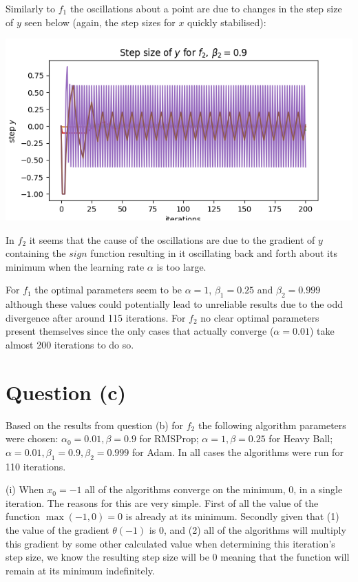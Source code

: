 \documentclass[12pt]{article}
\begin{document}
Similarly to $f_1$ the oscillations about a point are due to changes in the step size of $y$ seen below (again, the step sizes for $x$ quickly stabilised):

\begin{center}
    \includegraphics[scale=0.6]{figs/b/b_iii_stepy_f2.png}
\end{center}

In $f_2$ it seems that the cause of the oscillations are due to the gradient of $y$ containing the $sign$ function resulting in it oscillating back and forth about its minimum when the learning rate $\alpha$ is too large.

For $f_1$ the optimal parameters seem to be $\alpha=1$, $\beta_1=0.25$ and $\beta_2=0.999$ although these values could potentially lead to unreliable results due to the odd divergence after around 115 iterations. For $f_2$ no clear optimal parameters present themselves since the only cases that actually converge ($\alpha=0.01$) take almost 200 iterations to do so.

\section*{Question (c)}

Based on the results from question (b) for $f_2$ the following algorithm parameters were chosen: $\alpha_0=0.01, \beta=0.9$ for RMSProp; $\alpha=1, \beta=0.25$ for Heavy Ball; $\alpha=0.01, \beta_1=0.9, \beta_2=0.999$ for Adam. In all cases the algorithms were run for 110 iterations.

\noindent (i) When $x_0=-1$ all of the algorithms converge on the minimum, 0, in a single iteration. The reasons for this are very simple. First of all the value of the function $\max(-1, 0)=0$ is already at its minimum. Secondly given that (1) the value of the gradient $\theta(-1)$ is 0, and (2) all of the algorithms will multiply this gradient by some other calculated value when determining this iteration's step size, we know the resulting step size will be 0 meaning that the function will remain at its minimum indefinitely.
\end{document}
